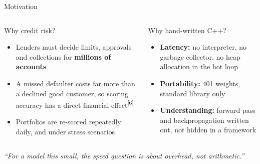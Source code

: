 \documentclass[aspectratio=169]{beamer}
\newcommand{\cit}[1]{\textsuperscript{\textcolor{accent}{[#1]}}}
\newenvironment{eq}[1]{\begin{minipage}[t][#1][t]{\linewidth}\raggedright\hyphenpenalty=10000 }{\end{minipage}}
\begin{document}
\begin{frame}{Motivation}
  \begin{columns}[T]
      \begin{alertblock}{Why credit risk?}
\begin{eq}{3.7cm}
        \small
        \begin{itemize}
          \item Lenders must decide limits, approvals and collections
                for \textbf{millions of accounts}
          \item A missed defaulter costs far more than a declined good customer,
                so scoring accuracy has a direct financial effect\cit{6}
          \item Portfolios are re-scored repeatedly: daily, and under stress scenarios
        \end{itemize}
      \end{eq}
      \end{alertblock}
      \begin{block}{Why hand-written C++?}
\begin{eq}{3.7cm}
        \small
        \begin{itemize}
          \item \textcolor{mlgreen}{\textbf{Latency:}} no interpreter, no garbage collector,
                no heap allocation in the hot loop
          \item \textcolor{mlgreen}{\textbf{Portability:}} 401 weights, standard library only
          \item \textcolor{mlgreen}{\textbf{Understanding:}} forward pass and backpropagation
                written out, not hidden in a framework
        \end{itemize}
      \end{eq}
      \end{block}
  \end{columns}

  \vspace{0.45cm}
  \centering
  \textit{``For a model this small, the speed question is about overhead, not arithmetic.''}
\end{frame}
\end{document}
